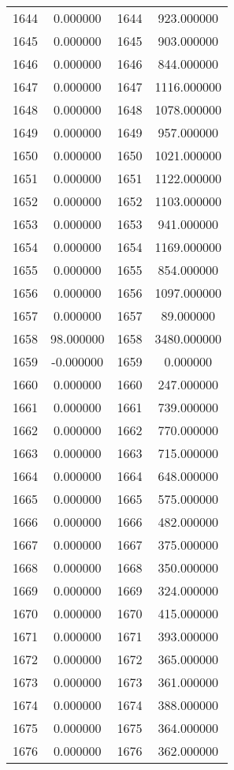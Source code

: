 \documentclass[12pt]{article}
\begin{document}
\begin{longtable}{@{}cccc@{}}
1644 & 0.000000 & 1644 & 923.000000 \\
1645 & 0.000000 & 1645 & 903.000000 \\
1646 & 0.000000 & 1646 & 844.000000 \\
1647 & 0.000000 & 1647 & 1116.000000 \\
1648 & 0.000000 & 1648 & 1078.000000 \\
1649 & 0.000000 & 1649 & 957.000000 \\
1650 & 0.000000 & 1650 & 1021.000000 \\
1651 & 0.000000 & 1651 & 1122.000000 \\
1652 & 0.000000 & 1652 & 1103.000000 \\
1653 & 0.000000 & 1653 & 941.000000 \\
1654 & 0.000000 & 1654 & 1169.000000 \\
1655 & 0.000000 & 1655 & 854.000000 \\
1656 & 0.000000 & 1656 & 1097.000000 \\
1657 & 0.000000 & 1657 & 89.000000 \\
1658 & 98.000000 & 1658 & 3480.000000 \\
1659 & -0.000000 & 1659 & 0.000000 \\
1660 & 0.000000 & 1660 & 247.000000 \\
1661 & 0.000000 & 1661 & 739.000000 \\
1662 & 0.000000 & 1662 & 770.000000 \\
1663 & 0.000000 & 1663 & 715.000000 \\
1664 & 0.000000 & 1664 & 648.000000 \\
1665 & 0.000000 & 1665 & 575.000000 \\
1666 & 0.000000 & 1666 & 482.000000 \\
1667 & 0.000000 & 1667 & 375.000000 \\
1668 & 0.000000 & 1668 & 350.000000 \\
1669 & 0.000000 & 1669 & 324.000000 \\
1670 & 0.000000 & 1670 & 415.000000 \\
1671 & 0.000000 & 1671 & 393.000000 \\
1672 & 0.000000 & 1672 & 365.000000 \\
1673 & 0.000000 & 1673 & 361.000000 \\
1674 & 0.000000 & 1674 & 388.000000 \\
1675 & 0.000000 & 1675 & 364.000000 \\
1676 & 0.000000 & 1676 & 362.000000 \\

\end{longtable}
\end{document}
